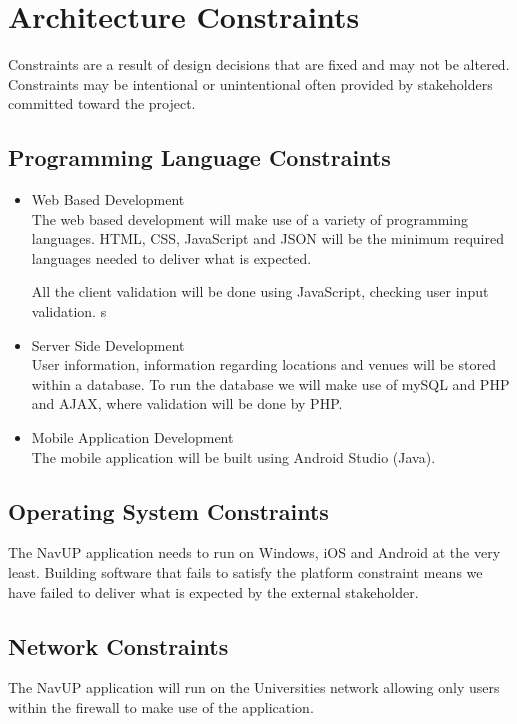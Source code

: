 \documentclass{article}
\begin{document}
	\section{Architecture Constraints}
	Constraints are a result of design decisions that are fixed and may not be altered. Constraints may be intentional or unintentional often provided by stakeholders committed toward the project.
		
		\subsection{Programming Language Constraints}
			\begin{itemize}
 				\item Web Based Development
 				\bigskip
 				\\ 				
 				The web based development will make use of a variety of programming languages. HTML, CSS, JavaScript and JSON will be the minimum required languages needed to deliver what is expected.
 				
 				All the client validation will be done using JavaScript, checking user input validation.			
s 				
  				\item Server Side Development
  				\bigskip
 				\\
 				User information, information regarding locations and venues will be stored within a database. To run the database we will make use of mySQL and PHP and AJAX, where validation will be done by PHP.
 				
 				\item Mobile Application  Development
  				\bigskip
 				\\
 				The mobile application will be built using Android Studio (Java).
 							
			\end{itemize}
			
		\subsection{Operating System Constraints}			   
 				The NavUP application needs to run on Windows, iOS and Android at the very least. Building software that fails to satisfy the platform constraint means we have failed to deliver what is expected by the external stakeholder. 
 				
 		\subsection{Network Constraints}			 
 				The NavUP application will run on the Universities network allowing only users within the firewall to make use of the application.
 				
\end{document}
